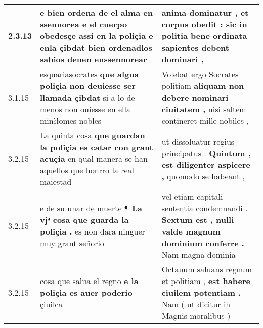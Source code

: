 \begin{tabular}{|p{1cm}|p{6.5cm}|p{6.5cm}|}

\hline
2.3.13 & e bien ordena de el alma en ssennorea \textbf{ e el cuerpo obedesçe assi en la poliçia } e enla çibdat bien ordenadlos sabios deuen enssennorear & anima dominatur , \textbf{ et corpus obedit : } sic in politia bene ordinata sapientes debent dominari , \\\hline
3.1.15 & esquariasocrates \textbf{ que algua poliçia non deuiesse ser llamada çibdat } si a lo de menos non ouiesse en ella minłłomes nobles & Volebat ergo Socrates politiam \textbf{ aliquam non debere nominari ciuitatem , } nisi saltem contineret mille nobiles , \\\hline
3.2.15 & La quinta cosa \textbf{ que guardan la poliçia es catar con grant acuçia } en qual manera se han aquellos que honrro la real maiestad & ut dissoluatur regius principatus . \textbf{ Quintum , est diligenter aspicere , } quomodo se habeant , \\\hline
3.2.15 & e de su unar de muerte ¶ \textbf{ La vjͣ cosa que guarda la poliçia . } es non dara ninguer muy grant señorio & vel etiam capitali sententia condemnandi . \textbf{ Sextum est , nulli valde magnum dominium conferre . } Nam magna dominia \\\hline
3.2.15 & cosa que salua el regno \textbf{ e la poliçia es auer poderio } çiuilca & Octauum saluans regnum et politiam , \textbf{ est habere ciuilem potentiam . } Nam ( ut dicitur in Magnis moralibus ) \\\hline

\end{tabular}
